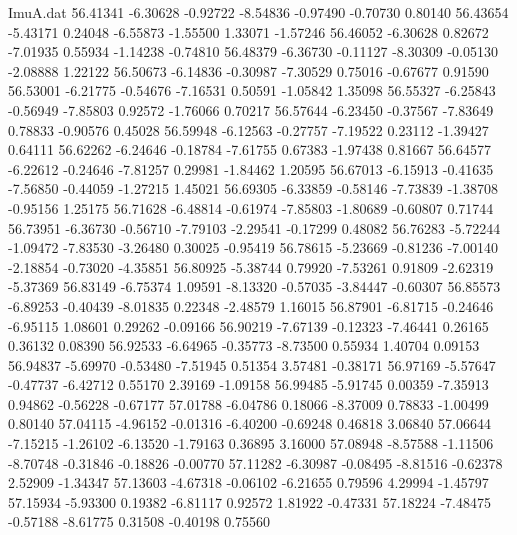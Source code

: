 \begin{filecontents}{ImuA.dat}
  56.41341   -6.30628   -0.92722   -8.54836   -0.97490   -0.70730    0.80140
  56.43654   -5.43171    0.24048   -6.55873   -1.55500    1.33071   -1.57246
  56.46052   -6.30628    0.82672   -7.01935    0.55934   -1.14238   -0.74810
  56.48379   -6.36730   -0.11127   -8.30309   -0.05130   -2.08888    1.22122
  56.50673   -6.14836   -0.30987   -7.30529    0.75016   -0.67677    0.91590
  56.53001   -6.21775   -0.54676   -7.16531    0.50591   -1.05842    1.35098
  56.55327   -6.25843   -0.56949   -7.85803    0.92572   -1.76066    0.70217
  56.57644   -6.23450   -0.37567   -7.83649    0.78833   -0.90576    0.45028
  56.59948   -6.12563   -0.27757   -7.19522    0.23112   -1.39427    0.64111
  56.62262   -6.24646   -0.18784   -7.61755    0.67383   -1.97438    0.81667
  56.64577   -6.22612   -0.24646   -7.81257    0.29981   -1.84462    1.20595
  56.67013   -6.15913   -0.41635   -7.56850   -0.44059   -1.27215    1.45021
  56.69305   -6.33859   -0.58146   -7.73839   -1.38708   -0.95156    1.25175
  56.71628   -6.48814   -0.61974   -7.85803   -1.80689   -0.60807    0.71744
  56.73951   -6.36730   -0.56710   -7.79103   -2.29541   -0.17299    0.48082
  56.76283   -5.72244   -1.09472   -7.83530   -3.26480    0.30025   -0.95419
  56.78615   -5.23669   -0.81236   -7.00140   -2.18854   -0.73020   -4.35851
  56.80925   -5.38744    0.79920   -7.53261    0.91809   -2.62319   -5.37369
  56.83149   -6.75374    1.09591   -8.13320   -0.57035   -3.84447   -0.60307
  56.85573   -6.89253   -0.40439   -8.01835    0.22348   -2.48579    1.16015
  56.87901   -6.81715   -0.24646   -6.95115    1.08601    0.29262   -0.09166
  56.90219   -7.67139   -0.12323   -7.46441    0.26165    0.36132    0.08390
  56.92533   -6.64965   -0.35773   -8.73500    0.55934    1.40704    0.09153
  56.94837   -5.69970   -0.53480   -7.51945    0.51354    3.57481   -0.38171
  56.97169   -5.57647   -0.47737   -6.42712    0.55170    2.39169   -1.09158
  56.99485   -5.91745    0.00359   -7.35913    0.94862   -0.56228   -0.67177
  57.01788   -6.04786    0.18066   -8.37009    0.78833   -1.00499    0.80140
  57.04115   -4.96152   -0.01316   -6.40200   -0.69248    0.46818    3.06840
  57.06644   -7.15215   -1.26102   -6.13520   -1.79163    0.36895    3.16000
  57.08948   -8.57588   -1.11506   -8.70748   -0.31846   -0.18826   -0.00770
  57.11282   -6.30987   -0.08495   -8.81516   -0.62378    2.52909   -1.34347
  57.13603   -4.67318   -0.06102   -6.21655    0.79596    4.29994   -1.45797
  57.15934   -5.93300    0.19382   -6.81117    0.92572    1.81922   -0.47331
  57.18224   -7.48475   -0.57188   -8.61775    0.31508   -0.40198    0.75560

\end{filecontents}
